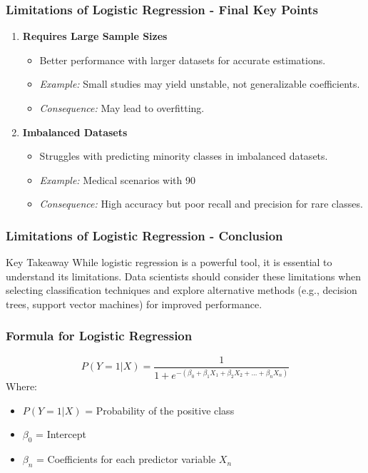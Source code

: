 \documentclass[aspectratio=169]{beamer}
\begin{document}
\begin{frame}[fragile]
    \frametitle{Limitations of Logistic Regression - Final Key Points}
    \begin{enumerate}[resume]
        \item \textbf{Requires Large Sample Sizes}
        \begin{itemize}
            \item Better performance with larger datasets for accurate estimations.
            \item \textit{Example:} Small studies may yield unstable, not generalizable coefficients.
            \item \textit{Consequence:} May lead to overfitting.
        \end{itemize}
        
        \item \textbf{Imbalanced Datasets}
        \begin{itemize}
            \item Struggles with predicting minority classes in imbalanced datasets.
            \item \textit{Example:} Medical scenarios with 90%
            \item \textit{Consequence:} High accuracy but poor recall and precision for rare classes.
        \end{itemize}
    \end{enumerate}
\end{frame}

\begin{frame}[fragile]
    \frametitle{Limitations of Logistic Regression - Conclusion}
    \begin{block}{Key Takeaway}
        While logistic regression is a powerful tool, it is essential to understand its limitations. Data scientists should consider these limitations when selecting classification techniques and explore alternative methods (e.g., decision trees, support vector machines) for improved performance.
    \end{block}
\end{frame}

\begin{frame}[fragile]
    \frametitle{Formula for Logistic Regression}
    \begin{equation}
        P(Y=1|X) = \frac{1}{1 + e^{-(\beta_0 + \beta_1X_1 + \beta_2X_2 + ... + \beta_nX_n)}}
    \end{equation}
    Where: 
    \begin{itemize}
        \item $P(Y=1|X)$ = Probability of the positive class
        \item $\beta_0$ = Intercept
        \item $\beta_n$ = Coefficients for each predictor variable $X_n$
    \end{itemize}
\end{frame}
\end{document}
